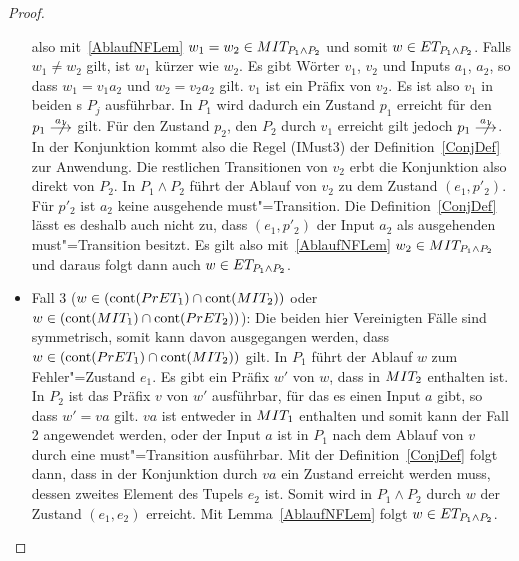 \begin{proof}
\begin{itemize}
      also mit~\ref{AblaufNFLem} $w_1=w_2\in MIT _{P_1\land P_2}$ und somit
      $w\in ET _{P_1\land P_2}$. Falls $w_1\neq w_2$ gilt, ist \oBdA{} $w_1$
      kürzer wie $w_2$. Es gibt Wörter $v_1$, $v_2$ und Inputs $a_1$, $a_2$, so
      dass $w_1=v_1a_2$ und $w_2=v_2a_2$ gilt. $v_1$ ist ein Präfix von $v_2$.
      Es ist also $v_1$ in beiden \MEIO{}s $P_j$ ausführbar. In $P_1$ wird
      dadurch ein Zustand $p_1$ erreicht für den $p_1\nmust[a_1]$ gilt. Für den
      Zustand $p_2$, den $P_2$ durch $v_1$ erreicht gilt jedoch
      $p_1\nmust[a_1]$. In der Konjunktion kommt also die Regel (IMust3) der
      Definition~\ref{ConjDef} zur Anwendung. Die restlichen Transitionen von
      $v_2$ erbt die Konjunktion also direkt von $P_2$. In $P_1\land P_2$ führt
      der Ablauf von $v_2$ zu dem Zustand $(e_1,p'_2)$. Für $p'_2$ ist $a_2$
      keine ausgehende must"=Transition. Die Definition~\ref{ConjDef} lässt es
      deshalb auch nicht zu, dass $(e_1,p'_2)$ der Input $a_2$ als ausgehenden
      must"=Transition besitzt. Es gilt also mit~\ref{AblaufNFLem} $w_2\in MIT
      _{P_1\land P_2}$ und daraus folgt dann auch $w\in ET _{P_1\land P_2}$.
    \item Fall 3 ($w\in (\mathrm{cont} (PrET _1)\cap \mathrm{cont} (MIT _2))$ oder $w\in
      (\mathrm{cont} (MIT _1)\cap \mathrm{cont} (PrET _2))$): Die beiden hier Vereinigten
      Fälle sind symmetrisch, somit kann \oBdA{} davon ausgegangen werden, dass
      $w\in (\mathrm{cont} (PrET _1)\cap \mathrm{cont} (MIT _2))$ gilt. In $P_1$ führt der
      Ablauf $w$ zum Fehler"=Zustand $e_1$. Es gibt ein Präfix $w'$ von $w$,
      dass in $MIT _2$ enthalten ist. In $P_2$ ist das Präfix $v$ von $w'$
      ausführbar, für das es einen Input $a$ gibt, so dass $w'=va$ gilt. $va$
      ist entweder in $MIT _1$ enthalten und somit kann der Fall 2 angewendet
      werden, oder der Input $a$ ist in $P_1$ nach dem Ablauf von $v$ durch
      eine must"=Transition ausführbar. Mit der Definition~\ref{ConjDef} folgt
      dann, dass in der Konjunktion durch $va$ ein Zustand erreicht werden
      muss, dessen zweites Element des Tupels $e_2$ ist. Somit wird in
      $P_1\land P_2$ durch $w$ der Zustand $(e_1,e_2)$ erreicht. Mit
      Lemma~\ref{AblaufNFLem} folgt $w\in ET _{P_1\land P_2}$.
  \end{itemize}


\end{proof}
